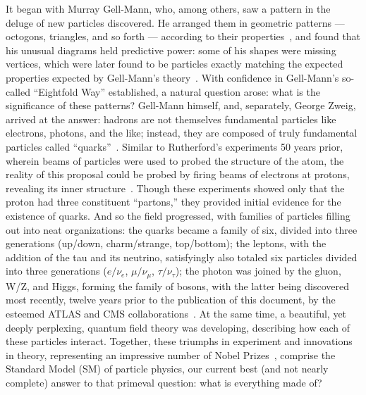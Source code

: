 \begin{dissertationintroduction}
It began with Murray Gell-Mann, who, among others, saw a pattern in the deluge of new particles discovered. 
He arranged them in geometric patterns --- octogons, triangles, and so forth --- according to their properties~\cite{Gell-Mann:1961omu}, and found that his unusual diagrams held predictive power: some of his shapes were missing vertices, which were later found to be particles exactly matching the expected properties expected by Gell-Mann's theory~\cite{PhysRevLett.12.204}. 
With confidence in Gell-Mann's so-called ``Eightfold Way'' established, a natural question arose: what is the significance of these patterns? 
Gell-Mann himself, and, separately, George Zweig, arrived at the answer: hadrons are not themselves fundamental particles like electrons, photons, and the like; instead, they are composed of truly fundamental particles called ``quarks''~\cite{Lichtenberg:784713}.
Similar to Rutherford's experiments 50 years prior, wherein beams of particles were used to probed the structure of the atom, the reality of this proposal could be probed by firing beams of electrons at protons, revealing its inner structure~\cite{PhysRevLett.23.930, PhysRevLett.23.935}. 
Though these experiments showed only that the proton had three constituent ``partons,'' they provided initial evidence for the existence of quarks.
And so the field progressed, with families of particles filling out into neat organizations: 
the quarks became a family of six, divided into three generations (up/down, charm/strange, top/bottom); %
the leptons, with the addition of the tau and its neutrino, satisfyingly also totaled six particles divided into three generations ($e/\nu_e$, $\mu/\nu_\mu$, $\tau/\nu_\tau$); %
the photon was joined by the gluon, W/Z, and Higgs, forming the family of bosons, with the latter being discovered most recently, twelve years prior to the publication of this document, by the esteemed ATLAS and CMS collaborations~\cite{ATLASdisc, CMSdisc}. %
At the same time, a beautiful, yet deeply perplexing, quantum field theory was developing, describing how each of these particles interact. 
Together, these triumphs in experiment and innovations in theory, representing an impressive number of Nobel Prizes~\cite{ParticleNobels}, comprise the Standard Model (SM) of particle physics, our current best (and not nearly complete) answer to that primeval question: what is everything made of? 


\end{dissertationintroduction}
